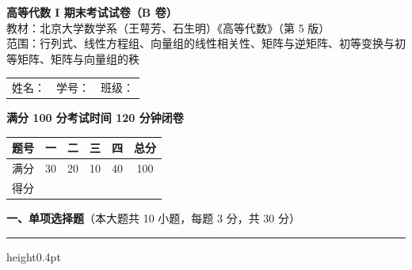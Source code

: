 \documentclass[12pt]{ctexart}
\newcommand{\bigsection}[2]{%
  \vspace{6pt}%
  {\noindent\bfseries\large #1}\hfill{\normalsize（本大题共 #2）}\par
  \vspace{2pt}\hrule height0.4pt\vspace{8pt}}
\newcommand{\blank}[1][2.6cm]{\underline{\hspace{#1}}}
\begin{document}
\begin{center}
  {\Large\bfseries 高等代数 I 期末考试试卷（B 卷）}\\[4pt]
  {\small 教材：北京大学数学系（王萼芳、石生明）《高等代数》（第 5 版）\\
  范围：行列式、线性方程组、向量组的线性相关性、矩阵与逆矩阵、初等变换与初等矩阵、矩阵与向量组的秩}\\[8pt]
\end{center}

\noindent
\begin{tabular}{@{}p{4.6cm}p{4.6cm}p{4.6cm}@{}}
姓名：\blank[2.8cm] & 学号：\blank[2.8cm] & 班级：\blank[2.8cm]
\end{tabular}

\vspace{6pt}
\noindent\textbf{满分 100 分\qquad 考试时间 120 分钟\qquad 闭卷}

\vspace{8pt}
\noindent
\renewcommand{\arraystretch}{1.4}
\begin{tabular}{|c|c|c|c|c|c|}
\hline
题号 & 一 & 二 & 三 & 四 & 总分 \\\hline
满分 & 30 & 20 & 10 & 40 & 100 \\\hline
得分 & & & & & \\\hline
\end{tabular}

\vspace{12pt}

\bigsection{一、单项选择题}{10 小题，每题 3 分，共 30 分}
\end{document}
